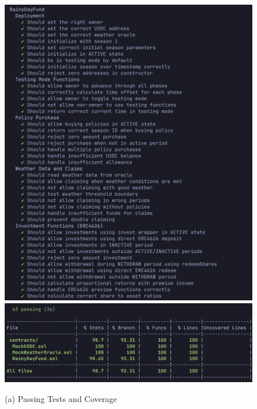 \documentclass[11pt,a4paper]{article}
\begin{document}
	\begin{figure}[H]
		\centering
		\begin{minipage}[b]{0.48\textwidth}
			\centering
			\includegraphics[width=0.95\linewidth]{graphics/Passing_Tests}
			\includegraphics[width=0.95\linewidth]{graphics/Test_Coverage}
			\caption*{(a) Passing Tests and Coverage}
		\end{minipage}\hfill
		\begin{minipage}[b]{0.48\textwidth}
			\centering

\end{minipage}
\end{figure}
\end{document}
